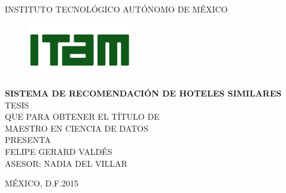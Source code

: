 \documentclass[12pt]{report}
\begin{document}
%
{\large
\begin{center}
INSTITUTO TECNOL\'OGICO AUT\'ONOMO DE M\'EXICO
\end{center}
\begin{figure}[h]
 	\centering
	\includegraphics[width=0.4\textwidth]{imagenes/logo_ITAM.jpg}
	\end{figure}
\begin{center}
\vspace{0cm}
\textbf{SISTEMA DE RECOMENDACIÓN DE HOTELES SIMILARES}\\
\vspace{1cm}
TESIS\\
\vspace{1cm}
{\normalsize QUE PARA OBTENER EL T\'ITULO DE}\\
\vspace{0.5cm}
MAESTRO EN CIENCIA DE DATOS\\
\vspace{0.5cm}
{\normalsize PRESENTA}\\
\vspace{1cm}
FELIPE GERARD VALD\'ES\\
\vspace{2cm}
{\normalsize ASESOR: NADIA DEL VILLAR}\\
\vspace{2cm}
\end{center}
\begin{flushleft}
M\'EXICO, D.F.\hfill 2015%
\end{flushleft}
}
 
\end{document}
